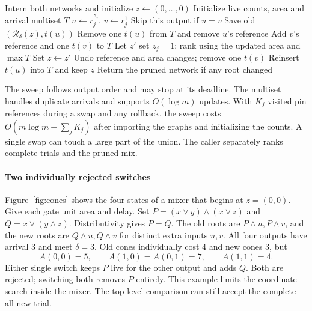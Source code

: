\documentclass[journal,10pt]{IEEEtran}
\newcommand{\rank}{\mathcal{R}}
\begin{document}
\begin{algorithm}[!t]
\caption{Greedy output-cone mixing}
\label{alg:mix}
\footnotesize
\begin{algorithmic}[1]
\State Intern both networks and initialize \(z\gets(0,\ldots,0)\)
\State Initialize live counts, area and arrival multiset \(T\)
  \State \(u\gets r_j^{z_j}\), \(v\gets r_j^1\)
  \State Skip this output if \(u=v\)
  \State Save old \((\rank_\delta(z),t(u))\)
  \State Remove one \(t(u)\) from \(T\) and remove \(u\)'s reference
  \State Add \(v\)'s reference and one \(t(v)\) to \(T\)
  \State Let \(z'\) set \(z_j=1\); rank using the updated area and \(\max T\)
  \If{\((\rank_\delta(z'),t(v))\) strictly improves}
    \State Set \(z\gets z'\)
  \Else
    \State Undo reference and area changes; remove one \(t(v)\)
    \State Reinsert \(t(u)\) into \(T\) and keep \(z\)
  \EndIf
\EndFor
\State Return the pruned network if any root changed
\end{algorithmic}
\end{algorithm}

The sweep follows output order and may stop at its deadline. The multiset handles duplicate arrivals and supports \(O(\log m)\) updates. With \(K_j\) visited pin references during a swap and any rollback, the sweep costs \(O(m\log m+\sum_j K_j)\) after importing the graphs and initializing the counts. A single swap can touch a large part of the union. The caller separately ranks complete trials and the pruned mix.

\paragraph{Two individually rejected switches}
Figure~\ref{fig:cones} shows the four states of a mixer that begins at \(z=(0,0)\).
Give each gate unit area and delay. Set \(P=(x\lor y)\land(x\lor z)\) and \(Q=x\lor(y\land z)\). Distributivity gives \(P=Q\). The old roots are \(P\land u,P\land v\), and the new roots are \(Q\land u,Q\land v\) for distinct extra inputs \(u,v\). All four outputs have arrival 3 and meet \(\delta=3\). Old cones individually cost 4 and new cones 3, but
\[
 A(0,0)=5,\qquad A(1,0)=A(0,1)=7,\qquad A(1,1)=4.
\]
Either single switch keeps \(P\) live for the other output and adds \(Q\). Both are rejected; switching both removes \(P\) entirely. This example limits the coordinate search inside the mixer. The top-level comparison can still accept the complete all-new trial.
\end{document}
